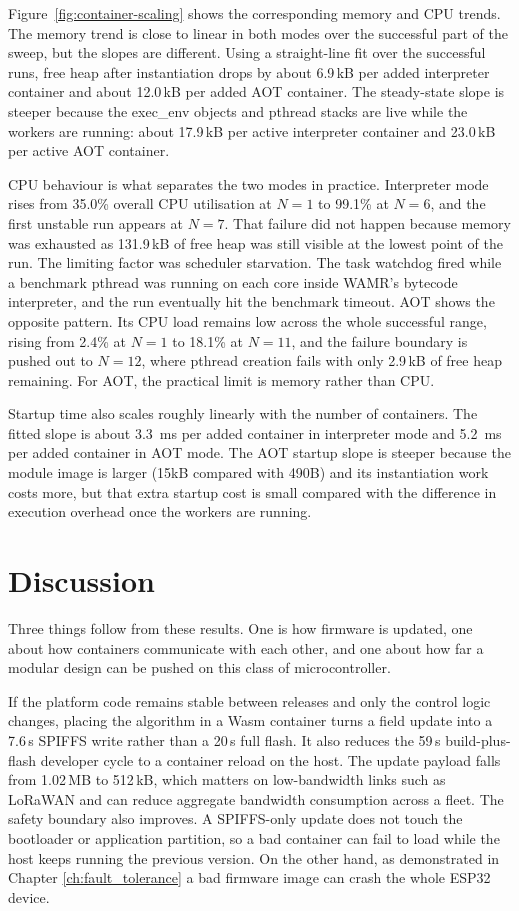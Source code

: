 \documentclass[12pt, a4paper]{report}
\begin{document}
Figure~\ref{fig:container-scaling} shows the corresponding memory and CPU trends. The memory trend is close to linear in both modes over the successful part of the sweep, but the slopes are different. Using a straight-line fit over the successful runs, free heap after instantiation drops by about 6.9\,kB per added interpreter container and about 12.0\,kB per added AOT container. The steady-state slope is steeper because the exec\_env objects and pthread stacks are live while the workers are running: about 17.9\,kB per active interpreter container and 23.0\,kB per active AOT container. 

CPU behaviour is what separates the two modes in practice. Interpreter mode rises from 35.0\% overall CPU utilisation at $N=1$ to 99.1\% at $N=6$, and the first unstable run appears at $N=7$. That failure did not happen because memory was exhausted as 131.9\,kB of free heap was still visible at the lowest point of the run. The limiting factor was scheduler starvation. The task watchdog fired while a benchmark pthread was running on each core inside WAMR's bytecode interpreter, and the run eventually hit the benchmark timeout. AOT shows the opposite pattern. Its CPU load remains low across the whole successful range, rising from 2.4\% at $N=1$ to 18.1\% at $N=11$, and the failure boundary is pushed out to $N=12$, where pthread creation fails with only 2.9\,kB of free heap remaining. For AOT, the practical limit is memory rather than CPU.

Startup time also scales roughly linearly with the number of containers. The fitted slope is about 3.3~ms per added container in interpreter mode and 5.2~ms per added container in AOT mode. The AOT startup slope is steeper because the module image is larger (15kB compared with 490B) and its instantiation work costs more, but that extra startup cost is small compared with the difference in execution overhead once the workers are running.


\section{Discussion}
\label{sec:containerization-discussion}

Three things follow from these results. One is how firmware is updated, one about how containers communicate with each other, and one about how far a modular design can be pushed on this class of microcontroller.

If the platform code remains stable between releases and only the control logic changes, placing the algorithm in a Wasm container turns a field update into a 7.6\,s SPIFFS write rather than a 20\,s full flash. It also reduces the 59\,s build-plus-flash developer cycle to a container reload on the host. The update payload falls from 1.02\,MB to 512\,kB, which matters on low-bandwidth links such as LoRaWAN and can reduce aggregate bandwidth consumption across a fleet. The safety boundary also improves. A SPIFFS-only update does not touch the bootloader or application partition, so a bad container can fail to load while the host keeps running the previous version. On the other hand, as demonstrated in Chapter \ref{ch:fault_tolerance} a bad firmware image can crash the whole ESP32 device.
\end{document}
